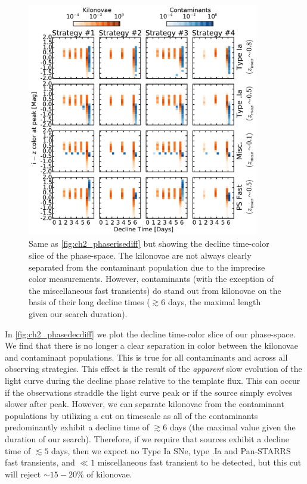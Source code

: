 \begin{figure}[t!]
\centering
\includegraphics[width=0.9\textwidth]{./figs/chapter2/ch2_f16.pdf}
\caption{Same as \autoref{fig:ch2_phaserisediff} but showing the decline time-color slice of the phase-space. The kilonovae are not always clearly separated from the contaminant population due to the imprecise color measurements. However, contaminants (with the exception of the miscellaneous fast transients) do stand out from kilonovae on the basis of their long decline times ($\gtrsim 6$ days, the maximal length given our search duration).}
\label{fig:ch2_phasedecdiff}
\end{figure}

In \autoref{fig:ch2_phasedecdiff} we plot the decline time-color slice of our phase-space. We find that there is no longer a clear separation in color between the kilonovae and contaminant populations. This is true for all contaminants and across all observing strategies. This effect is the result of the {\em apparent} slow evolution of the light curve during the decline phase relative to the template flux. This can occur if the observations straddle the light curve peak or if the source simply evolves slower after peak. However, we can separate kilonovae from the contaminant populations by utilizing a cut on timescale as all of the contaminants predominantly exhibit a decline time of $\gtrsim 6$ days (the maximal value given the duration of our search). Therefore, if we require that sources exhibit a decline time of $\lesssim 5$ days, then we expect no Type Ia SNe, type .Ia and Pan-STARRS fast transients, and $\ll 1$ miscellaneous fast transient to be detected, but this cut will reject $\sim15-20\%$ of kilonovae.

